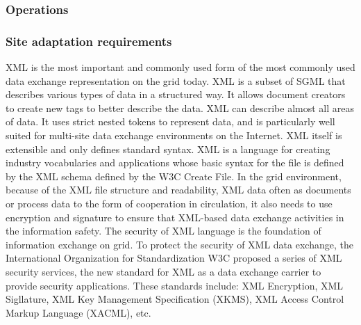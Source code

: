 
\subsubsection{Operations}


\subsubsection{Site adaptation requirements}
XML is the most important and commonly used form of the most commonly used data exchange representation on the grid today. XML is a subset of SGML that describes various types of data in a structured way. It allows document creators to create new tags to better describe the data. XML can describe almost all areas of data. It uses strict nested tokens to represent data, and is particularly well suited for multi-site data exchange environments on the Internet. XML itself is extensible and only defines standard syntax. XML is a language for creating industry vocabularies and applications whose basic syntax for the file is defined by the XML schema defined by the W3C Create File. In the grid environment, because of the XML file structure and readability, XML data often as documents or process data to the form of cooperation in circulation, it also needs to use encryption and signature to ensure that XML-based data exchange activities in the information safety. The security of XML language is the foundation of information exchange on grid. To protect the security of XML data exchange, the International Organization for Standardization W3C proposed a series of XML security services, the new standard for XML as a data exchange carrier to provide security applications. These standards include: XML Encryption, XML Sigllature, XML Key Management Specification (XKMS), XML Access Control Markup Language (XACML), etc.

